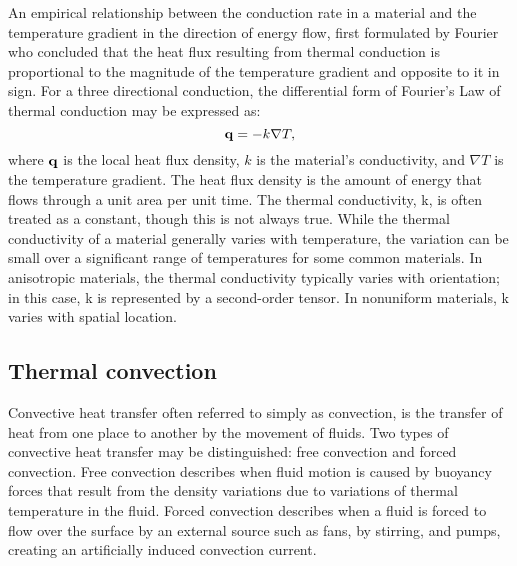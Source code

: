 

An empirical relationship between the conduction rate in a material and the temperature gradient in the direction of energy flow, first formulated by Fourier who concluded that the heat flux resulting from thermal conduction is proportional to the magnitude of the temperature gradient and opposite to it in sign.
For a three directional conduction, the differential form of Fourier's Law of thermal conduction may be expressed as:
\begin{equation}
{\bf{q}} =  - k\nabla T,
\end{equation}
where $\bf{q}$ is the local heat flux density, $k$ is the material's conductivity, and $\nabla T$ is the temperature gradient.
The heat flux density is the amount of energy that flows through a unit area per unit time.
The thermal conductivity, k, is often treated as a constant, though this is not always true.
While the thermal conductivity of a material generally varies with temperature, the variation can be small over a significant range of temperatures for some common materials.
In anisotropic materials, the thermal conductivity typically varies with orientation; in this case, k is represented by a second-order tensor. In nonuniform materials, k varies with spatial location.

\subsection{Thermal convection}
\noindent
Convective heat transfer often referred to simply as convection, is the transfer of heat from one place to another by the movement of fluids.
Two types of convective heat transfer may be distinguished: free convection and forced convection.
Free convection describes when fluid motion is caused by buoyancy forces that result from the density variations due to variations of thermal temperature in the fluid.
Forced convection describes when a fluid is forced to flow over the surface by an external source such as fans, by stirring, and pumps, creating an artificially induced convection current.

